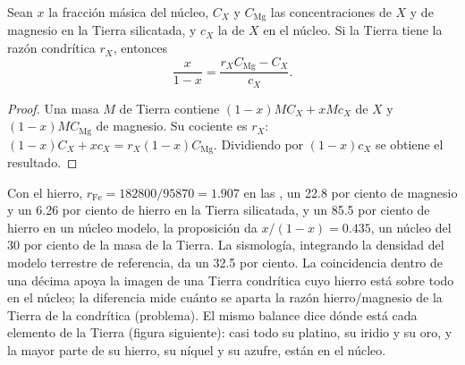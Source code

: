 \begin{proposition}
\label{prop:b2:elements-in-the-earth:core}
Sean $x$ la fracción másica del núcleo, $C_X$ y $C_{\mathrm{Mg}}$ las
concentraciones de $X$ y de magnesio en la Tierra silicatada, y $c_X$ la de $X$ en
el núcleo. Si la Tierra tiene la razón condrítica $r_X$, entonces
\[
  \frac{x}{1-x} = \frac{r_X C_{\mathrm{Mg}} - C_X}{c_X}.
\]
\end{proposition}

\begin{proof}
Una masa $M$ de Tierra contiene $(1-x)MC_X + xMc_X$ de $X$ y $(1-x)MC_{\mathrm{Mg}}$ de
magnesio. Su cociente es $r_X$:
$(1-x)C_X + xc_X = r_X(1-x)C_{\mathrm{Mg}}$. Dividiendo por $(1-x)c_X$ se obtiene el
resultado.
\end{proof}

Con el hierro, $r_{\mathrm{Fe}} = \num{182800}/\num{95870} = 1.907$ en las , un
22.8 por ciento de magnesio y un 6.26 por ciento de hierro en la Tierra silicatada, y un 85.5 por
ciento de hierro en un núcleo modelo, la proposición da $x/(1-x) = 0.435$, un núcleo del 30
por ciento de la masa de la Tierra. La sismología, integrando la densidad del
modelo terrestre de referencia, da un 32.5 por ciento. La coincidencia dentro de una décima
apoya la imagen de una Tierra condrítica cuyo hierro está sobre todo en el núcleo; la
diferencia mide cuánto se aparta la razón hierro/magnesio de la Tierra de la
condrítica (problema). El mismo balance dice dónde está cada elemento de la Tierra
(figura siguiente): casi todo su platino, su iridio y su oro, y la mayor parte de su hierro,
su níquel y su azufre, están en el núcleo.

\begin{omfigure}
\centering
{}
\par{}
\end{omfigure}

